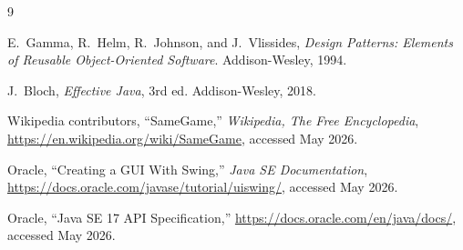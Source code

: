 \documentclass[12pt,a4paper]{article}
\begin{document}
\begin{thebibliography}{9}

  E.~Gamma, R.~Helm, R.~Johnson, and J.~Vlissides,
  \emph{Design Patterns: Elements of Reusable Object-Oriented Software}.
  Addison-Wesley, 1994.

  J.~Bloch,
  \emph{Effective Java}, 3rd ed.
  Addison-Wesley, 2018.

  Wikipedia contributors,
  ``SameGame,''
  \emph{Wikipedia, The Free Encyclopedia},
  \url{https://en.wikipedia.org/wiki/SameGame},
  accessed May 2026.

  Oracle,
  ``Creating a GUI With Swing,''
  \emph{Java SE Documentation},
  \url{https://docs.oracle.com/javase/tutorial/uiswing/},
  accessed May 2026.

  Oracle,
  ``Java SE 17 API Specification,''
  \url{https://docs.oracle.com/en/java/docs/},
  accessed May 2026.

\end{thebibliography}
\end{document}
